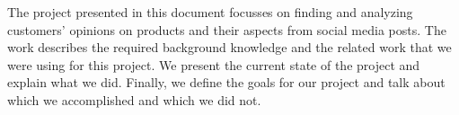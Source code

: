 The project presented in this document focusses on finding and analyzing customers' opinions on products and their aspects from social media posts. The work describes the required background knowledge and the related work that we were using for this project. We present the current state of the project and explain what we did. Finally, we define the goals for our project and talk about which we accomplished and which we did not.
